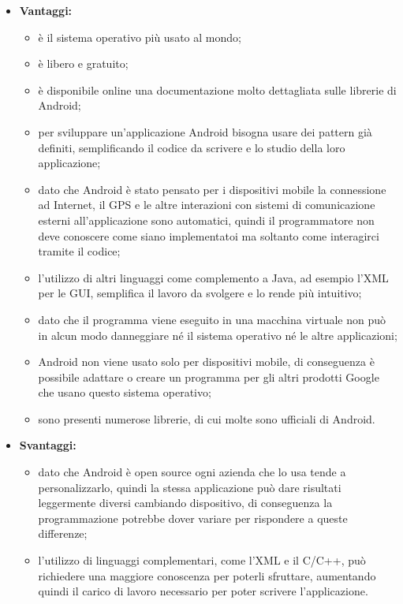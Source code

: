 	\begin{itemize}
		\item \textbf{Vantaggi:}
			\begin{itemize}
				\item è il sistema operativo più usato al mondo;
				\item è libero e gratuito;
				\item è disponibile online una documentazione molto dettagliata sulle librerie di Android;
				\item per sviluppare un'applicazione Android bisogna usare dei pattern già definiti, semplificando il codice da scrivere e lo studio della loro applicazione;
				\item dato che Android è stato pensato per i dispositivi mobile la connessione ad Internet, il GPS e le altre interazioni con sistemi di comunicazione esterni all'applicazione sono automatici, quindi il programmatore non deve conoscere come siano implementatoi ma soltanto come interagirci tramite il codice;
				\item l'utilizzo di altri linguaggi come complemento a Java, ad esempio l'XML per le GUI, semplifica il lavoro da svolgere e lo rende più intuitivo;
				\item dato che il programma viene eseguito in una macchina virtuale non può in alcun modo danneggiare né il sistema operativo né le altre applicazioni;
				\item Android non viene usato solo per dispositivi mobile, di conseguenza è possibile adattare o creare un programma per gli altri prodotti Google che usano questo sistema operativo;
				\item sono presenti numerose librerie, di cui molte sono ufficiali di Android.
			\end{itemize}
		\item \textbf{Svantaggi:}
			\begin{itemize}
				\item dato che Android è open source ogni azienda che lo usa tende a personalizzarlo, quindi la stessa applicazione può dare risultati leggermente diversi cambiando dispositivo, di conseguenza la programmazione potrebbe dover variare per rispondere a queste differenze;
				\item l'utilizzo di linguaggi complementari, come l'XML e il C/C++, può richiedere una maggiore conoscenza per poterli sfruttare, aumentando quindi il carico di lavoro necessario per poter scrivere l'applicazione.
			\end{itemize}
	\end{itemize}
